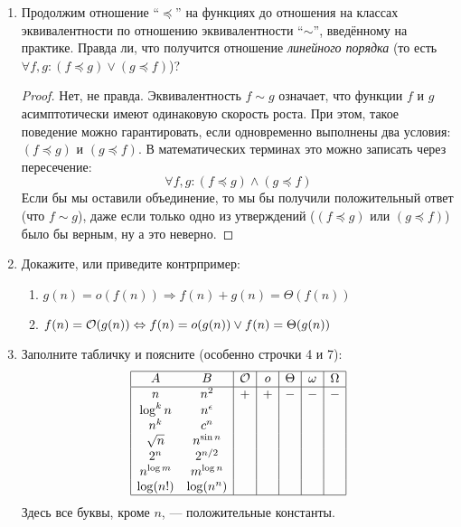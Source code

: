 \begin{enumerate}
  \item
    Продолжим отношение ``$\preceq$'' на функциях до отношения на классах эквивалентности по отношению эквивалентности ``$\sim$'', введённому на практике. Правда ли, что получится отношение \textit{линейного порядка} (то есть
    $\forall f, g: (f \preceq g) \lor (g \preceq f)$)?
    \begin{proof}
      Нет, не правда. Эквивалентность $f \sim g$ означает, что функции $f$ и $g$ асимптотически имеют одинаковую скорость роста. При этом, такое поведение можно гарантировать, если одновременно выполнены два условия: $(f \preceq g)$ и $(g \preceq f)$. В математических терминах это можно записать через пересечение:
      \begin{equation}
        \forall f, g: (f \preceq g) \land (g \preceq f)
      \end{equation}
      Если бы мы оставили объединение, то мы бы получили положительный ответ (что $f \sim g$), даже если только одно из утверждений ($(f \preceq g)$ или $(g \preceq f)$) было бы верным, ну а это неверно.
    \end{proof}

  \item
    Докажите, или приведите контрпример:
    \begin{enumerate}
      \item $g(n) = o(f(n)) \Rightarrow f(n) + g(n) = \Theta(f(n))$
      \item $f(n) = \mathcal{O}(g(n)) \Leftrightarrow f(n) = o(g(n)) \lor f(n) = \Theta(g(n))$
    \end{enumerate}

  \item Заполните табличку и поясните (особенно строчки 4 и 7):
    $$
    \begin{array}{|cc|c|c|c|c|c|}
      \hline
      A & B & \mathcal{O} & o & \Theta & \omega & \Omega \\
      \hline
      n & n^2 & + & + & - & - & - \\
      \log^k n & n^{\epsilon} & & & & & \\
      n^k & c^n & & & & & \\
      \sqrt{n} & n^{\sin n} & & & & & \\
      2^n & 2^{n \slash 2} & & & & & \\
      n^{\log m} & m^{\log n} & & & & & \\
      \log (n!) & \log(n^n) & & & & & \\
      \hline
    \end{array}
    $$
    Здесь все буквы, кроме $n$, --- положительные константы.


\end{enumerate}
